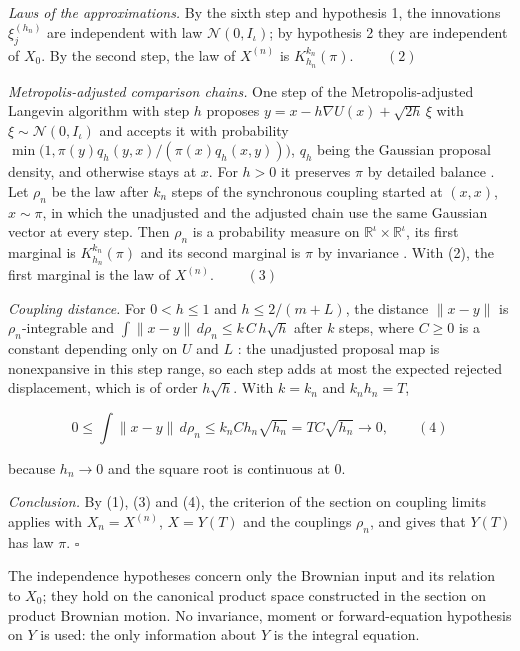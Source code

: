 \documentclass[11pt,a4paper]{article}
\begin{document}
\emph{Laws of the approximations.} By the sixth step and hypothesis 1, the innovations \(\xi^{(h_n)}_j\) are independent with law \(\mathcal N(0,I_\iota)\); by hypothesis 2 they are independent of \(X_0\). By the second step, the law of \(X^{(n)}\) is \(K_{h_n}^{k_n}(\pi)\). \(\qquad(2)\)




\emph{Metropolis-adjusted comparison chains.} One step of the Metropolis-adjusted Langevin algorithm with step \(h\) proposes \(y=x-h\nabla U(x)+\sqrt{2h}\,\xi\) with \(\xi\sim\mathcal N(0,I_\iota)\) and accepts it with probability \(\min\bigl(1,\pi(y)q_h(y,x)/(\pi(x)q_h(x,y))\bigr)\), \(q_h\) being the Gaussian proposal density, and otherwise stays at \(x\). For \(h>0\) it preserves \(\pi\) by detailed balance \cite[Section~3.39.6]{LangevinLean2026ULASC}. Let \(\rho_n\) be the law after \(k_n\) steps of the synchronous coupling started at \((x,x)\), \(x\sim\pi\), in which the unadjusted and the adjusted chain use the same Gaussian vector at every step. Then \(\rho_n\) is a probability measure on \(\mathbb R^\iota\times\mathbb R^\iota\), its first marginal is \(K_{h_n}^{k_n}(\pi)\) and its second marginal is \(\pi\) by invariance \cite[Section~3.36.17]{LangevinLean2026ULASC}. With (2), the first marginal is the law of \(X^{(n)}\). \(\qquad(3)\)




\emph{Coupling distance.} For \(0<h\le1\) and \(h\le2/(m+L)\), the distance \(\|x-y\|\) is \(\rho_n\)-integrable and \(\int\|x-y\|\,d\rho_n\le k\,C\,h\sqrt h\) after \(k\) steps, where \(C\ge0\) is a constant depending only on \(U\) and \(L\) \cite[Section~3.36.26]{LangevinLean2026ULASC}: the unadjusted proposal map is nonexpansive in this step range, so each step adds at most the expected rejected displacement, which is of order \(h\sqrt h\). With \(k=k_n\) and \(k_nh_n=T\),


\[0\le\int\|x-y\|\,d\rho_n\le k_nCh_n\sqrt{h_n}=TC\sqrt{h_n}\longrightarrow0,\qquad(4)\]


because \(h_n\to0\) and the square root is continuous at \(0\).




\emph{Conclusion.} By (1), (3) and (4), the criterion of the section on coupling limits \cite[Section~3.40.4]{LangevinLean2026ULASC} applies with \(X_n=X^{(n)}\), \(X=Y(T)\) and the couplings \(\rho_n\), and gives that \(Y(T)\) has law \(\pi\). \(\square\)




The independence hypotheses concern only the Brownian input and its relation to \(X_0\); they hold on the canonical product space constructed in the section on product Brownian motion. No invariance, moment or forward-equation hypothesis on \(Y\) is used: the only information about \(Y\) is the integral equation.
\end{document}

